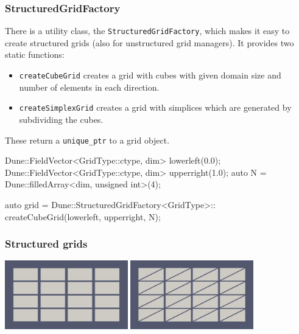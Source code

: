 \documentclass[aspectratio=169,11pt]{beamer}
\theoremstyle{definition}
\begin{document}
\begin{frame}[fragile]
\frametitle{StructuredGridFactory}
There is a utility class, the \lstinline!StructuredGridFactory!, which makes it easy to create
structured grids (also for unstructured grid managers). It provides two static functions:
\begin{itemize}
 \item \lstinline!createCubeGrid! creates a grid with cubes with given domain size and number
of elements in each direction.
\item \lstinline!createSimplexGrid! creates a grid with simplices which are generated by subdividing
the cubes.
\end{itemize}
These return a \lstinline!unique_ptr! to a grid object.

\begin{cppcode}
Dune::FieldVector<GridType::ctype, dim> lowerleft(0.0);
Dune::FieldVector<GridType::ctype, dim> upperright(1.0);
auto N = Dune::filledArray<dim, unsigned int>(4);

auto grid = Dune::StructuredGridFactory<GridType>::
              createCubeGrid(lowerleft, upperright, N);
\end{cppcode}

\end{frame}

\begin{frame}
 \frametitle{Structured grids}
 \centering
 \includegraphics[trim=85 85 85 85,clip=true,
 width=0.4\textwidth,
 height=0.4\textwidth]{figures/io/structure1}
 \hspace*{0.07\linewidth}
 \includegraphics[trim=85 85 85 85,clip=true,
 width=0.4\textwidth,
 height=0.4\textwidth]{figures/io/structure2}
\end{frame}
\end{document}
